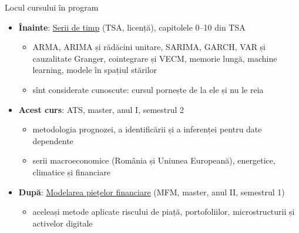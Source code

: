 \begin{frame}{Locul cursului în program}
\itemsize{\footnotesize}
\begin{itemize}
    \item \textbf{Înainte}: \href{https://danpele.github.io/Time-Series-Analysis/}{Serii de timp} (TSA, licență), capitolele 0--10 din TSA
    \begin{itemize}
        \item ARMA, ARIMA și rădăcini unitare, SARIMA, GARCH, VAR și cauzalitate Granger, cointegrare și VECM, memorie lungă, machine learning, modele în spațiul stărilor
        \item sînt considerate cunoscute: cursul pornește de la ele și nu le reia
    \end{itemize}
    \item \textbf{Acest curs}: ATS, master, anul I, semestrul 2
    \begin{itemize}
        \item metodologia prognozei, a identificării și a inferenței pentru date dependente
        \item serii macroeconomice (România și Uniunea Europeană), energetice, climatice și financiare
    \end{itemize}
    \item \textbf{După}: \href{https://danpele.github.io/MFM/}{Modelarea piețelor financiare} (MFM, master, anul II, semestrul 1)
    \begin{itemize}
        \item aceleași metode aplicate riscului de piață, portofoliilor, microstructurii și activelor digitale
    \end{itemize}
\end{itemize}
\end{frame}

